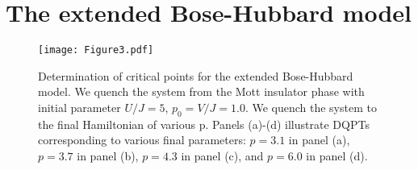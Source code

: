 \documentclass[%
reprint,
superscriptaddress,
amsmath,amssymb,
aps,
pra,
floatfix,
]{revtex4-1}
\begin{document}







\section{The extended Bose-Hubbard model}
\begin{figure*}[htbp]
	\texttt{[image: Figure3.pdf]}
	\caption{ Determination of critical points for the extended Bose-Hubbard model. We quench the system from the Mott insulator phase with initial parameter $U/J=5$, $p_0=V/J=1.0$. We quench the system to the final Hamiltonian of various p. Panels (a)-(d) illustrate DQPTs corresponding to various final parameters: $p=3.1$ in panel (a), $p=3.7$ in panel (b), $p=4.3$ in panel (c), and $p=6.0$ in panel (d).
	}
	\label{fig:1.0}	
\end{figure*}
\end{document}
